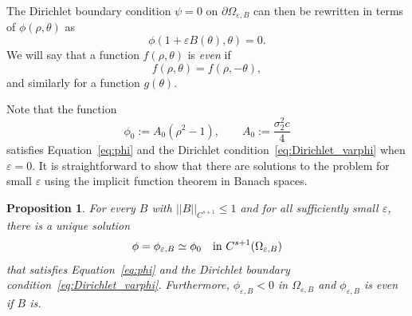 \documentclass[12pt,reqno]{amsart}
\numberwithin{equation}{section}
\newtheorem{proposition}[theorem]{Proposition}
\theoremstyle{definition}
\theoremstyle{remark}
\begin{document}
The Dirichlet boundary condition $\psi=0$ on $\partial\varOmega_{\varepsilon, B}$ can then be rewritten in terms of $\phi(\rho,\theta)$ as
\begin{equation}\label{eq:Dirichlet_varphi}
\phi(1+\varepsilon B(\theta),\theta) = 0 .
\end{equation}
We will say that a function $f(\rho,\theta)$ is \emph{even} if
\[
f(\rho,\theta) = f(\rho,-\theta) ,
\]
and similarly for a function $g(\theta)$.

Note that the function
\[
\phi_0:=A_0(\rho^2-1),
\qquad
A_0:=\frac{\sigma_2^2c}{4} 
\]
satisfies Equation~\eqref{eq:phi} and the Dirichlet condition~\eqref{eq:Dirichlet_varphi} when $\varepsilon=0$. It is straightforward to show that there are solutions to the problem for small $\varepsilon$ using the implicit function theorem in Banach spaces.
 

\begin{proposition}\label{prop:Dirichlet}
	For every $B$ with $||B||_{C^{s+1}}\le1$ and for all sufficiently small $\varepsilon $, there is a unique solution
	\begin{equation*}%
	\phi=\phi_{\varepsilon,B}\simeq \phi_0\quad\hbox{in }C^{s+1}(\Omega_{\varepsilon,B}) 
	\end{equation*}
	that satisfies Equation~\eqref{eq:phi} and the Dirichlet boundary condition~\eqref{eq:Dirichlet_varphi}.
	Furthermore, $\phi_{\varepsilon,B}<0$ in $\varOmega_{\varepsilon, B}$ and $\phi_{\varepsilon,B}$ is even if $B$ is.
\end{proposition}
\end{document}
